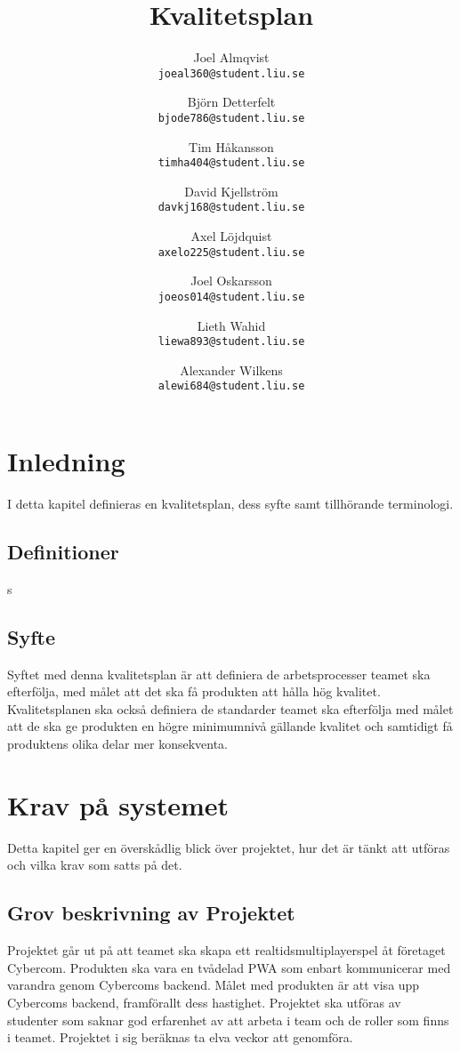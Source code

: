 \documentclass[10pt]{article}
\title{Kvalitetsplan}
\author{
    Joel Almqvist\\
    \texttt{joeal360@student.liu.se}
    \and
    Björn Detterfelt\\
    \texttt{bjode786@student.liu.se}
    \and
    Tim Håkansson\\
    \texttt{timha404@student.liu.se}
    \and
    David Kjellström\\
    \texttt{davkj168@student.liu.se}
    \and
    Axel Löjdquist\\
    \texttt{axelo225@student.liu.se}
    \and
    Joel Oskarsson\\
    \texttt{joeos014@student.liu.se}
    \and
    Lieth Wahid\\
    \texttt{liewa893@student.liu.se}
    \and
    Alexander Wilkens\\
    \texttt{alewi684@student.liu.se}
}
\begin{document}
\maketitle
\pagebreak
\tableofcontents
\pagebreak
\section{Inledning}
	I detta kapitel definieras en kvalitetsplan, dess syfte samt tillhörande terminologi.

	\subsection{Definitioner}
  \begin{itemize}[leftmargin=5cm]
    s
	\end{itemize}	
	
	\subsection{Syfte}
		Syftet med denna kvalitetsplan är att definiera de arbetsprocesser teamet ska efterfölja, med målet att det ska få produkten att hålla hög kvalitet. Kvalitetsplanen ska också definiera de standarder teamet ska efterfölja med målet att de ska ge produkten en högre minimumnivå gällande kvalitet och samtidigt få produktens olika delar mer konsekventa.

		
\pagebreak
\section{Krav på systemet}
	Detta kapitel ger en överskådlig blick över projektet, hur det är tänkt att utföras och vilka krav som satts på det.

	\subsection{Grov beskrivning av Projektet}
	Projektet går ut på att teamet ska skapa ett realtidsmultiplayerspel åt företaget Cybercom. Produkten ska vara en tvådelad PWA som enbart kommunicerar med varandra genom Cybercoms backend. Målet med produkten är att visa upp Cybercoms backend, framförallt dess hastighet.
	Projektet ska utföras av studenter som saknar god erfarenhet av att arbeta i team och de roller som finns i teamet. Projektet i sig beräknas ta elva veckor att genomföra. 
	
\end{document}
